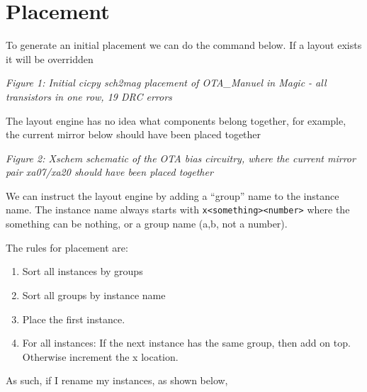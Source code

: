 \section{Placement}\label{placement}

To generate an initial placement we can do the command below. If a
layout exists it will be overridden

\begin{Shaded}
\begin{Highlighting}[]
\end{Highlighting}
\end{Shaded}


{
\centering
{}
}

\emph{Figure 1: Initial cicpy sch2mag placement of OTA\_Manuel in Magic
- all transistors in one row, 19 DRC errors}

The layout engine has no idea what components belong together, for
example, the current mirror below should have been placed together


{
\centering
{}
}

\emph{Figure 2: Xschem schematic of the OTA bias circuitry, where the
current mirror pair xa07/xa20 should have been placed together}

We can instruct the layout engine by adding a ``group'' name to the
instance name. The instance name always starts with
\texttt{x\textless{}something\textgreater{}\textless{}number\textgreater{}}
where the something can be nothing, or a group name (a,b, not a number).

The rules for placement are:

\begin{enumerate}
\def\labelenumi{\arabic{enumi}.}
\tightlist
\item
  Sort all instances by groups
\item
  Sort all groups by instance name
\item
  Place the first instance.
\item
  For all instances: If the next instance has the same group, then add
  on top. Otherwise increment the x location.
\end{enumerate}

As such, if I rename my instances, as shown below,


{
\centering
{}
}

